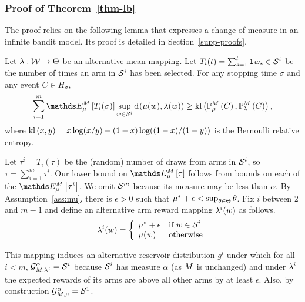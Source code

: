 \subsubsection{Proof of Theorem~\ref{thm-lb}}

The proof relies on the following lemma that expresses a change of
measure in an infinite bandit model. Its proof is detailed in
Section~\ref{supp-proofs}. 

\begin{lemma}\label{lem-CD} Let $\lambda : \mathcal{W} \rightarrow \Theta$ be an
alternative mean-mapping.
Let
$T_i(t) = \sum_{s=1}^t\mathbf{1}{w_s \in \mathcal{S}^{i}}$
be the number of times an arm in $\mathcal{S}^{i}$ has been
 selected.
For any stopping time $\sigma$ and
any
event $C \in H_\sigma$,
%
\vspace{-15pt}
%
\begin{align*}
\sum_{i=1}^m \ETrueModel{T_i(\sigma)} \sup_{\arm \in \ArmGrp{i}} \ArmKL{\ArmMean(\arm)}{\ArmMeanAlt(\arm)}
\geq  \BernKL{\PrTrueModel{C}}{\PrAltModel{C}},
\end{align*}
where $\operatorname{kl}\left( x, y \right)=x\log(x/y) + (1-x)\log((1-x)/(1-y))$ is the Bernoulli relative
entropy.
\end{lemma}

Let $\tau^i = T_i(\tau)$ be the (random) number of draws from arms in 
$\mathcal{S}^{i}$,
so $\tau = \sum_{i=1}^m \tau^i$. Our lower bound on $\ETrueModel{\tau}$ follows
from
bounds on each of the $\ETrueModel{\tau^i}$.
We omit $\mathcal{S}^{m}$ because its measure may be less than $\alpha$.
%
By Assumption~\ref{ass:mu}, there is $\epsilon>0$ such that $\mu^* +
\epsilon < \sup_{\theta\in \Theta} \theta$.
Fix $i$ between $2$ and $m-1$ and define an alternative arm reward mapping
$\lambda^i(w)$ as follows.
\begin{align}
\lambda^i(w) = \left\{
\begin{array}{ll}
\mu^* + \epsilon & \text{if } w \in \mathcal{S}^{i} \\
\mu(w) & \text{otherwise}
\end{array}
\right.
\end{align}

This
 mapping induces an alternative reservoir distribution $g^i$
under which for all $i < m$, 
$\mathcal{G}_{M,\lambda^i}^{\alpha} = \mathcal{S}^{i}$ because
$\mathcal{S}^{i}$ has measure $\alpha$
(as $M$ is unchanged)
and under $\lambda^i$ the expected rewards of its arms
are above all other arms by at least $\epsilon$.
Also, by construction $\mathcal{G}_{M,\mu}^{\alpha} = \mathcal{S}^{1}$.

